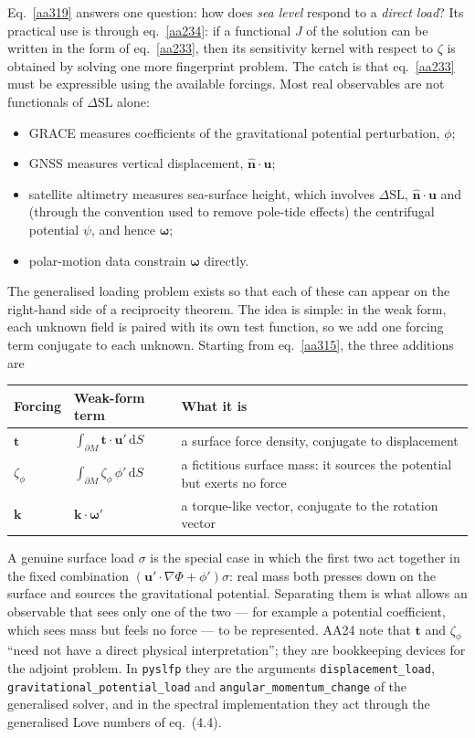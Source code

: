 \documentclass[11pt,a4paper]{article}
\newcommand{\bw}{\bm{\omega}}
\newcommand{\bu}{\mathbf{u}}
\newcommand{\bt}{\mathbf{t}}
\newcommand{\bk}{\mathbf{k}}
\newcommand{\bn}{\hat{\mathbf{n}}}
\newcommand{\dSL}{\Delta\mathrm{SL}}
\newcommand{\dd}{\,\mathrm{d}}
\newcommand{\pM}{\partial M}
\begin{document}
Eq.~\eqref{aa319} answers one question: how does \emph{sea level} respond to a \emph{direct load}?
Its practical use is through eq.~\eqref{aa234}: if a functional $J$ of the solution can be written
in the form of eq.~\eqref{aa233}, then its sensitivity kernel with respect to $\zeta$ is obtained by
solving one more fingerprint problem. The catch is that eq.~\eqref{aa233} must be expressible using
the available forcings. Most real observables are not functionals of $\dSL$ alone:
\begin{itemize}
  \item GRACE measures coefficients of the gravitational potential perturbation, $\phi$;
  \item GNSS measures vertical displacement, $\bn\cdot\bu$;
  \item satellite altimetry measures sea-surface height, which involves $\dSL$, $\bn\cdot\bu$ and (through the convention used to remove pole-tide effects) the centrifugal potential $\psi$, and hence $\bw$;
  \item polar-motion data constrain $\bw$ directly.
\end{itemize}
The generalised loading problem exists so that each of these can appear on the right-hand side of a
reciprocity theorem. The idea is simple: in the weak form, each unknown field is paired with its own
test function, so we add one forcing term conjugate to each unknown. Starting from
eq.~\eqref{aa315}, the three additions are
\begin{center}
\begin{tabular}{@{}llp{7.6cm}@{}}
\toprule
Forcing & Weak-form term & What it is\\
\midrule
$\bt$ & $\int_{\pM}\bt\cdot\bu'\dd S$ & a surface force density, conjugate to displacement\\
$\zeta_\phi$ & $\int_{\pM}\zeta_\phi\,\phi'\dd S$ & a fictitious surface mass: it sources the potential but exerts no force\\
$\bk$ & $\bk\cdot\bw'$ & a torque-like vector, conjugate to the rotation vector\\
\bottomrule
\end{tabular}
\end{center}
A genuine surface load $\sigma$ is the special case in which the first two act together in the fixed
combination $(\bu'\cdot\nabla\Phi+\phi')\sigma$: real mass both presses down on the surface and
sources the gravitational potential. Separating them is what allows an observable that sees only one
of the two --- for example a potential coefficient, which sees mass but feels no force --- to be
represented. AA24 note that $\bt$ and $\zeta_\phi$ ``need not have a direct physical
interpretation''; they are bookkeeping devices for the adjoint problem. In
\texttt{pyslfp} they are the arguments \texttt{displacement\_load}, \texttt{gravitational\_potential\_load}
and \texttt{angular\_momentum\_change} of the generalised solver, and in the spectral implementation
they act through the generalised Love numbers of eq.~(4.4).
\end{document}
